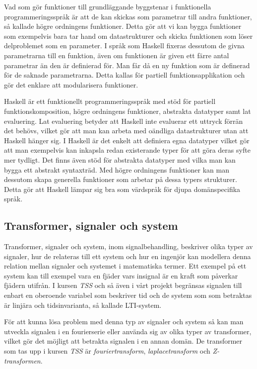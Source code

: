 \documentclass[]{article}
\begin{document}
Vad som gör funktioner till grundläggande byggstenar i funktionella
programmeringsspråk är att de kan skickas som parametrar till andra funktioner,
så kallade högre ordningens funktioner.
Detta gör att vi kan bygga funktioner som exempelvis bara tar hand om
datastrukturer och skicka funktionen som löser delproblemet som en parameter.
I språk som Haskell fixeras dessutom de givna parametrarna till en funktion,
även om funktionen är given ett färre antal parametrar än den är definierad för. Man får då en ny funktion som är definerad för de saknade parametrarna.
Detta kallas för partiell funktionsapplikation och gör det enklare att modularisera funktioner.

Haskell är ett funktionellt programmeringsspråk med stöd för partiell funktionskomposition,
högre ordningens funktioner, abstrakta datatyper samt lat evaluering.
Lat evaluering betyder att Haskell inte evaluerar ett uttryck förrän det behövs, vilket gör att man kan arbeta med oändliga datastrukturer utan att Haskell hänger sig.
I Haskell är det enkelt att definiera egna datatyper vilket gör att man exempelvis kan inkapsla redan existerande typer för att göra deras syfte mer tydligt. Det finns även stöd för abstrakta datatyper med vilka man kan bygga ett abstrakt syntaxträd. Med högre ordningens funktioner kan man dessutom skapa generella funktioner som arbetar på dessa typers strukturer. Detta gör att Haskell lämpar sig bra som värdspråk för djupa domänspecifika språk.

\subsection{Transformer, signaler och system}
Transformer, signaler och system, inom signalbehandling, beskriver olika typer av signaler, hur de relateras till ett
system och hur en ingenjör kan modellera denna relation mellan signaler och systemet i matematiska termer. Ett exempel
på ett system kan till exempel vara en fjäder vars insignal är en kraft som påverkar fjädern utifrån. I kursen
\textit{TSS} och så även i vårt projekt begränsas signalen till enbart en oberoende variabel som beskriver tid och de
system som som betraktas är linjära och tidsinvarianta, så kallade  LTI-system.

För att kunna lösa problem med denna typ av signaler och system så kan man utveckla signalen i en fourierserie eller
använda sig av olika typer av transformer, vilket gör det möjligt att betrakta signalen i en annan domän. De transformer
som tas upp i kursen \textit{TSS} är \textit{fouriertransform}, \textit{laplacetransform} och \textit{Z-transformen}.
\end{document}
